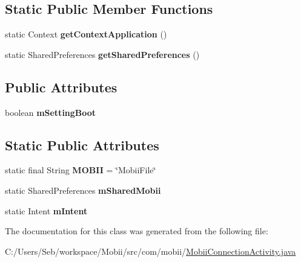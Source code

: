 \subsection*{Static Public Member Functions}
\begin{DoxyCompactItemize}
\item 
\hypertarget{classcom_1_1mobii_1_1_mobii_connection_activity_ae416cd0560407b850ea3159591854313}{static Context {\bfseries get\-Context\-Application} ()}\label{classcom_1_1mobii_1_1_mobii_connection_activity_ae416cd0560407b850ea3159591854313}

\item 
\hypertarget{classcom_1_1mobii_1_1_mobii_connection_activity_a0659b323be12d89f115cae2be36a0bcb}{static Shared\-Preferences {\bfseries get\-Shared\-Preferences} ()}\label{classcom_1_1mobii_1_1_mobii_connection_activity_a0659b323be12d89f115cae2be36a0bcb}

\end{DoxyCompactItemize}
\subsection*{Public Attributes}
\begin{DoxyCompactItemize}
\item 
\hypertarget{classcom_1_1mobii_1_1_mobii_connection_activity_a7217ea5f3ef0703380f61e384fe7b72b}{boolean {\bfseries m\-Setting\-Boot}}\label{classcom_1_1mobii_1_1_mobii_connection_activity_a7217ea5f3ef0703380f61e384fe7b72b}

\end{DoxyCompactItemize}
\subsection*{Static Public Attributes}
\begin{DoxyCompactItemize}
\item 
\hypertarget{classcom_1_1mobii_1_1_mobii_connection_activity_af039a613f66fbc8574605746adfba27a}{static final String {\bfseries M\-O\-B\-I\-I} = \char`\"{}Mobii\-File\char`\"{}}\label{classcom_1_1mobii_1_1_mobii_connection_activity_af039a613f66fbc8574605746adfba27a}

\item 
\hypertarget{classcom_1_1mobii_1_1_mobii_connection_activity_a36354f71c23fb377eae9cf230eff3e2f}{static Shared\-Preferences {\bfseries m\-Shared\-Mobii}}\label{classcom_1_1mobii_1_1_mobii_connection_activity_a36354f71c23fb377eae9cf230eff3e2f}

\item 
\hypertarget{classcom_1_1mobii_1_1_mobii_connection_activity_af3b3588039bc7c27fb05e7cf5778e385}{static Intent {\bfseries m\-Intent}}\label{classcom_1_1mobii_1_1_mobii_connection_activity_af3b3588039bc7c27fb05e7cf5778e385}

\end{DoxyCompactItemize}


The documentation for this class was generated from the following file\-:\begin{DoxyCompactItemize}
\item 
C\-:/\-Users/\-Seb/workspace/\-Mobii/src/com/mobii/\hyperlink{_mobii_connection_activity_8java}{Mobii\-Connection\-Activity.\-java}\end{DoxyCompactItemize}
